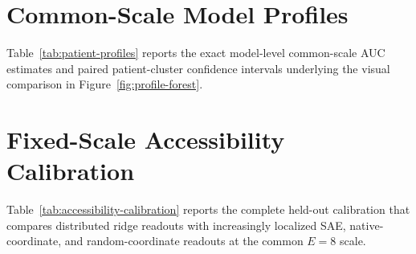 \appendix
\setcounter{figure}{0}
\renewcommand{\thefigure}{A\arabic{figure}}
\providecommand{\theHfigure}{}
\renewcommand{\theHfigure}{A\arabic{figure}}
\setcounter{table}{0}
\renewcommand{\thetable}{S\arabic{table}}
\providecommand{\theHtable}{}
\renewcommand{\theHtable}{S\arabic{table}}

\section{Common-Scale Model Profiles}
\label{app:patient-profiles}

Table~\ref{tab:patient-profiles} reports the exact model-level common-scale AUC estimates and paired patient-cluster confidence intervals underlying the visual comparison in Figure~\ref{fig:profile-forest}.

\begin{table}[!t]
  \centering
  \small
  \caption{Common-five-scale model profiles with paired patient-cluster 95\% intervals. The semantic column reports the train-selected single-coordinate $|r|$ AUC defined in Section~\ref{sec:benchmark-design}. Each AUC integrates the same $E\in\{1,4,8,16,32\}$ support and averages the same five depth targets and three SAE seeds.}
  \label{tab:patient-profiles}
\end{table}

\FloatBarrier
\section{Fixed-Scale Accessibility Calibration}
\label{app:accessibility-calibration}

Table~\ref{tab:accessibility-calibration} reports the complete held-out calibration that compares distributed ridge readouts with increasingly localized SAE, native-coordinate, and random-coordinate readouts at the common $E=8$ scale.

\begin{table}[!b]
  \centering
  \small
  \setlength{\tabcolsep}{3pt}
  \caption{Held-out $E=8$ accessibility calibration over five depths and 49 concepts. Ridge columns report mean $|r|$. One-dimensional entries report mean $|r|$/coverage at $|r|\geq.20$; SAE values average three seeds and random values average 20 dictionaries. All coordinates are selected on training data only.}
  \label{tab:accessibility-calibration}
\end{table}

